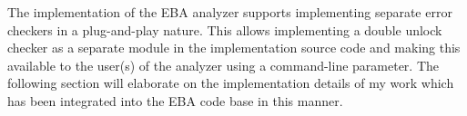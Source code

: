 \newpar The implementation of the EBA analyzer supports implementing separate error checkers in a plug-and-play nature. This allows implementing a double unlock checker as a separate module in the implementation source code and making this available to the user(s) of the analyzer using a command-line parameter. The following section will elaborate on the implementation details of my work which has been integrated into the EBA code base in this manner. 